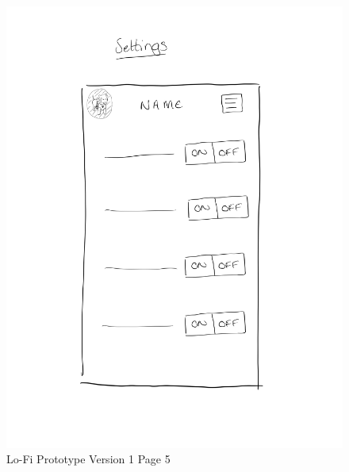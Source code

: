 \documentclass{ueacmpstyle}
\begin{document}
            \begin{figure}[h]
                
                \includegraphics[width=\linewidth]{Images/Lofi_v1_e.jpg}
                \caption{Lo-Fi Prototype Version 1 Page 5}
                \label{Figure Lofi v1 5}
                
            \end{figure}
            \clearpage
\end{document}
